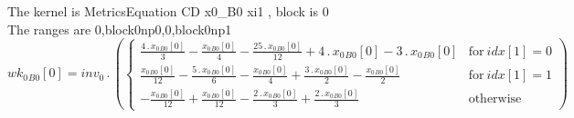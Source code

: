 \documentclass{article}
\begin{document}
\noindent The kernel is MetricsEquation CD x0_B0 xi1 , block is 0\\\noindent The ranges are 0,block0np0,0,block0np1\\\begin{dmath}{wk_{0}{_{B0}}}[{0}] = inv_0 \,.\, \left(\begin{cases} \frac{4 \,.\, {x_{0}{_{B0}}}[{0}]}{3} - \frac{{x_{0}{_{B0}}}[{0}]}{4} - \frac{25 \,.\, {x_{0}{_{B0}}}[{0}]}{12} + 4 \,.\, {x_{0}{_{B0}}}[{0}] - 3 \,.\, {x_{0}{_{B0}}}[{0}] & 
\text{for}\: {idx}[{1}] = 0 \\\frac{{x_{0}{_{B0}}}[{0}]}{12} - \frac{5 \,.\, {x_{0}{_{B0}}}[{0}]}{6} - \frac{{x_{0}{_{B0}}}[{0}]}{4} + \frac{3 \,.\, {x_{0}{_{B0}}}[{0}]}{2} - \frac{{x_{0}{_{B0}}}[{0}]}{2} & \text{for}\: {idx}[{1}] = 1 \\- 
\frac{{x_{0}{_{B0}}}[{0}]}{12} + \frac{{x_{0}{_{B0}}}[{0}]}{12} - \frac{2 \,.\, {x_{0}{_{B0}}}[{0}]}{3} + \frac{2 \,.\, {x_{0}{_{B0}}}[{0}]}{3} & \text{otherwise} \end{cases}\right)\end{dmath}
\end{document}
